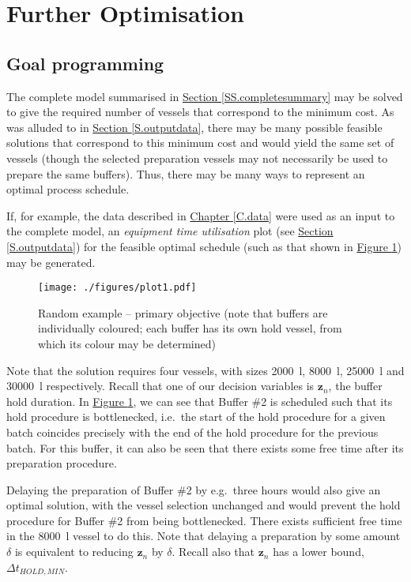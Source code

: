 \section{Further Optimisation}\label{S.secondary}

\subsection{Goal programming}\label{SS.goal}
The complete model summarised in 
\hyperref[SS.completesummary]{Section \ref*{SS.completesummary}} may be solved
to give the required number of vessels that correspond to the minimum cost.
As was alluded to in \hyperref[S.outputdata]{Section \ref*{S.outputdata}},
there may be many possible feasible solutions that correspond to this minimum
cost and would yield the same set of vessels (though the selected preparation
vessels may not necessarily be used to prepare the same buffers).
Thus, there may be many ways to represent an optimal process schedule.

If, for example, the data described in
\hyperref[C.data]{Chapter \ref*{C.data}} were used as an input to the complete
model, an \emph{equipment time utilisation} plot (see
\hyperref[S.outputdata]{Section \ref*{S.outputdata}}) for the feasible optimal
schedule (such as that shown in 
\hyperref[fig.primary]{Figure \ref*{fig.primary}})
may be generated.
\begin{figure}
    \centering
    \texttt{[image: ./figures/plot1.pdf]}
    \caption{Random example -- primary objective (note that buffers are
        individually coloured; each buffer has its own hold vessel, from which
        its colour may be determined)}
    \label{fig.primary}
\end{figure}

Note that the solution requires four vessels, with sizes
\SI{2000}{\litre}, \SI{8000}{\litre}, \SI{25000}{\litre} and \SI{30000}{\litre}
respectively.  
Recall that one of our decision variables is $\boldsymbol{z}_{n}$, the buffer
hold duration.
In \hyperref[fig.primary]{Figure \ref*{fig.primary}}, we can see that Buffer
\#2 is scheduled such that its hold procedure is bottlenecked, i.e.\ the start
of the hold procedure for a given batch coincides precisely with the end of the
hold procedure for the previous batch.
For this buffer, it can also be seen that there exists some free time after
its preparation procedure.

Delaying the preparation of Buffer \#2 by e.g.\ three hours would
also give an optimal solution, with the vessel selection unchanged and would
prevent the hold procedure for Buffer \#2 from being bottlenecked.
There exists sufficient free time in the \SI{8000}{\litre} vessel to do this.
Note that delaying a preparation by some amount $\delta$ is equivalent to 
reducing $\boldsymbol{z}_{n}$ by $\delta$.
Recall also that $\boldsymbol{z}_{n}$ has a lower bound, 
$\Delta t_{\mathit{HOLD,MIN}}$.

